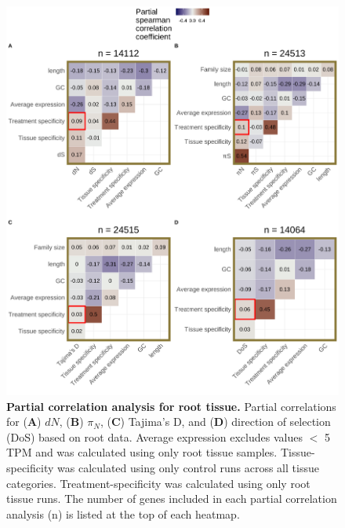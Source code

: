\documentclass[12pt]{article}
\begin{document}
\begin{figure}[H]
\centering
\includegraphics[width = 0.95\linewidth]{figures/appendix_a/partialCorrelations_withTissueSpecificity_root_2023-02-20.pdf}
\caption{\textbf{Partial correlation analysis for root tissue.} Partial correlations for (\textbf{A}) $dN$, (\textbf{B}) $\pi_N$, (\textbf{C}) Tajima's D, and (\textbf{D}) direction of selection (DoS) based on root data. Average expression excludes values $<$ 5 TPM and was calculated using only root tissue samples. Tissue-specificity was calculated using only control runs across all tissue categories. Treatment-specificity was calculated using only root tissue runs. The number of genes included in each partial correlation analysis (n) is listed at the top of each heatmap.}%
\end{figure}

\newpage
\end{document}
